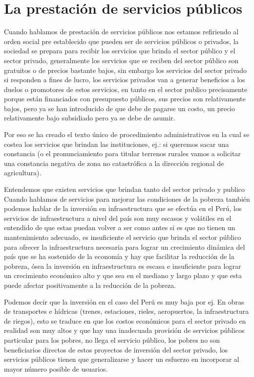 \documentclass[
  jou,
  floatsintext,
  longtable,
  a4paper,
  nolmodern,
  notxfonts,
  notimes,
  12pt,
  colorlinks=true,linkcolor=blue,citecolor=blue,urlcolor=blue]{apa7}
\begin{document}
\section{La prestación de servicios
públicos}\label{la-prestaciuxf3n-de-servicios-puxfablicos}

Cuando hablamos de prestación de servicios públicos nos estamos
refiriendo al orden social pre establecido que pueden ser de servicios
públicos o privados, la sociedad se prepara para recibir los servicios
que brinda el sector público y el sector privado, generalmente los
servicios que se reciben del sector público son gratuitos o de precios
bastante bajos, sin embargo los servicios del sector privado si
responden a fines de lucro, los servicios privados van a generar
beneficios a los duelos o promotores de estos servicios, en tanto en el
sector publico precisamente porque están financiados con presupuesto
públicos, sus precios son relativamente bajos, pero ya se han
introducido de que debe de pagarse un costo, un precio relativamente
bajo subsidiado pero ya se debe de asumir.

Por eso se ha creado el texto único de procedimiento administrativos en
la cual se costea los servicios que brindan las instituciones, ej.: si
queremos sacar una constancia (o el pronunciamiento para titular
terrenos rurales vamos a solicitar una constancia negativa de zona no
catastrófica a la dirección regional de agricultura).

Entendemos que existen servicios que brindan tanto del sector privado y
publico Cuando hablamos de servicios para mejorar las condiciones de la
pobreza también podemos hablar de la inversión en infraestructura que se
efectúa en el Perú, los servicios de infraestructura a nivel del país
son muy escasos y volátiles en el entendido de que estas puedan volver a
ser como antes si es que no tienen un mantenimiento adecuado, es
insuficiente el servicio que brinda el sector público para ofrecer la
infraestructura necesaria para lograr un crecimiento dinámica del país
que se ha sostenido de la economía y hay que facilitar la reducción de
la pobreza, ósea la inversión en infraestructura es escasa e
insuficiente para lograr un crecimiento económico alto y que sea en el
mediano y largo plazo y que esta puede afectar positivamente a la
reducción de la pobreza.

Podemos decir que la inversión en el caso del Perú es muy baja por ej.
En obras de transportes e hídricas (trenes, estaciones, rieles,
aeropuertos, la infraestructura de riegos), esto se traduce en que los
costos económicos para el sector privado en realidad son muy altos y que
hay una inadecuada provisión de servicios públicos particular para los
pobres, no llega el servicio público, los pobres no son beneficiarios
directos de estos proyectos de inversión del sector privado, los
servicios públicos tienen que generalizarse y hacer un esfuerzo en
incorporar al mayor número posible de usuarios.
\end{document}
